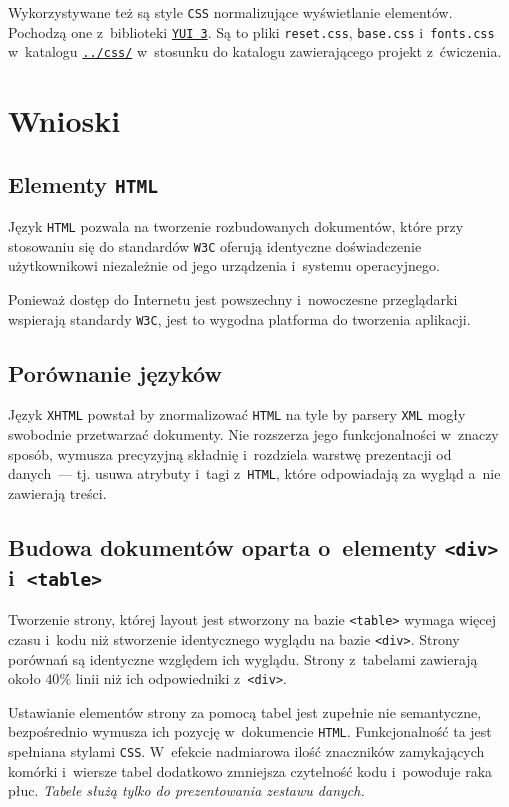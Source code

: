 \documentclass[10pt,a4paper]{article}
\newcommand{\f}[1]{\texttt{#1}}
\begin{document}
Wykorzystywane też są style \f{CSS} normalizujące wyświetlanie elementów.
Pochodzą one z~biblioteki \f{\href{http://yuilibrary.com/}{YUI 3}}. Są to pliki
\f{reset.css}, \f{base.css} i~\f{fonts.css} w~katalogu
\f{\href{https://github.com/student-tomasz/pi-laboratoria/tree/master/css}{../css/}}
w~stosunku do katalogu zawierającego projekt z~ćwiczenia.



\section{Wnioski}
\subsection{Elementy \f{HTML}}
Język \f{HTML} pozwala na tworzenie rozbudowanych dokumentów, które przy
stosowaniu się do standardów \f{W3C} oferują identyczne doświadczenie
użytkownikowi niezależnie od jego urządzenia i~systemu operacyjnego.

Ponieważ dostęp do Internetu jest powszechny i~nowoczesne przeglądarki wspierają
standardy \f{W3C}, jest to wygodna platforma do tworzenia aplikacji.

\subsection{Porównanie języków}
Język \f{XHTML} powstał by znormalizować \f{HTML} na tyle by parsery \f{XML}
mogły swobodnie przetwarzać dokumenty. Nie rozszerza jego funkcjonalności
w~znaczy sposób, wymusza precyzyjną składnię i~rozdziela warstwę prezentacji
od danych~--- tj. usuwa atrybuty i~tagi z~\f{HTML}, które odpowiadają za wygląd
a~nie zawierają treści.

\subsection{Budowa dokumentów oparta o~elementy \f{<div>} i~\f{<table>}}
Tworzenie strony, której layout jest stworzony na bazie \f{<table>} wymaga
więcej czasu i~kodu niż stworzenie identycznego wyglądu na bazie \f{<div>}.
Strony porównań są identyczne względem ich wyglądu. Strony z~tabelami zawierają
około $40\%$ linii niż ich odpowiedniki z~\f{<div>}.

Ustawianie elementów strony za pomocą tabel jest zupełnie nie semantyczne,
bezpośrednio wymusza ich pozycję w~dokumencie \f{HTML}. Funkcjonalność ta jest
spełniana stylami \f{CSS}. W~efekcie nadmiarowa ilość znaczników zamykających
komórki i~wiersze tabel dodatkowo zmniejsza czytelność kodu i~powoduje raka
płuc. \emph{Tabele służą tylko do prezentowania zestawu danych.}
\end{document}
